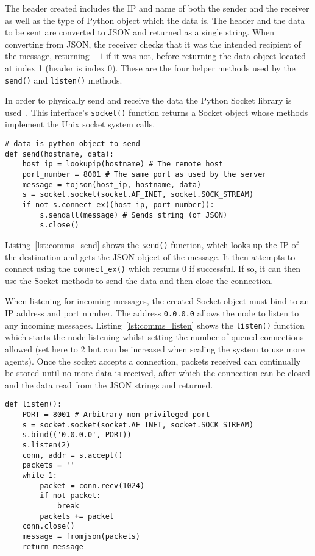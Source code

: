 The header created includes the IP and name of both the sender and the
receiver as well as the type of Python object which the data is. The header
and the data to be sent are converted to JSON and returned as a single
string. When  converting from JSON, the receiver checks that it was the
intended recipient of the message, returning $-1$ if it was not, before
returning the data object located at index 1 (header is index 0). These
are the four helper methods used by the \verb|send()| and \verb|listen()|
methods.

In order to physically send and receive the data the Python Socket library
is used~\cite{socketServerDocs}. This interface's \verb|socket()| function
returns a Socket object whose methods implement the Unix socket system calls.

\begin{lstlisting}[caption={send() Function}, label={lst:comms_send}]
# data is python object to send
def send(hostname, data):
    host_ip = lookupip(hostname) # The remote host
    port_number = 8001 # The same port as used by the server
    message = tojson(host_ip, hostname, data)
    s = socket.socket(socket.AF_INET, socket.SOCK_STREAM)
    if not s.connect_ex((host_ip, port_number)):
        s.sendall(message) # Sends string (of JSON)
        s.close()
\end{lstlisting}

Listing~\ref{lst:comms_send} shows the \verb|send()| function, which looks up the IP of the destination and gets the JSON
object of the message. It then attempts to connect using the \verb|connect_ex()|
which returns 0 if successful. If so, it can then use the Socket methods to send
the data and then close the connection.

When listening for incoming messages, the created Socket object must bind to
an IP address and port number. The address \verb|0.0.0.0| allows the node to listen
to any incoming messages. Listing~\ref{lst:comms_listen} shows the \verb|listen()| function which starts the node listening
whilst setting the number of queued connections allowed (set here to 2 but can
be increased when scaling the system to use more agents). Once the socket
accepts a connection, packets received can continually be stored
until no more data is received, after which the connection can be closed and
the data read from the JSON strings and returned.

\begin{lstlisting}[caption={\texttt{listen()} function}, label={lst:comms_listen}]
def listen():
    PORT = 8001 # Arbitrary non-privileged port
    s = socket.socket(socket.AF_INET, socket.SOCK_STREAM)
    s.bind(('0.0.0.0', PORT))
    s.listen(2)
    conn, addr = s.accept()
    packets = ''
    while 1:
        packet = conn.recv(1024)
        if not packet:
            break
        packets += packet
    conn.close()
    message = fromjson(packets)
    return message
\end{lstlisting}


